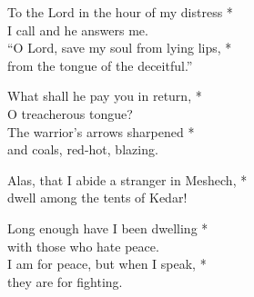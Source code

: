 To the Lord in the hour of my distress *\\
I call and he answers me.\\
“O Lord, save my soul from lying lips, *\\
from the tongue of the deceitful.”

What shall he pay you in return, *\\
O treacherous tongue?\\
The warrior's arrows sharpened *\\
and coals, red-hot, blazing.

Alas, that I abide a stranger in Meshech, *\\
dwell among the tents of Kedar!

Long enough have I been dwelling *\\
with those who hate peace.\\
I am for peace, but when I speak, *\\
they are for fighting.